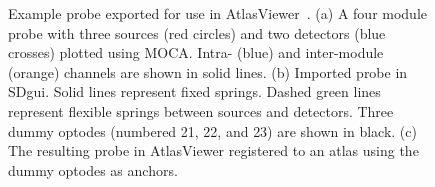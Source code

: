 \begin{figure}[]
\begin{center}
\end{center}
\caption{Example probe exported for use in AtlasViewer~\cite{Aasted2015}. (a) A four module probe with three sources (red circles) and two detectors (blue crosses) plotted using MOCA. Intra- (blue) and inter-module (orange) channels are shown in solid lines. (b) Imported probe in SDgui. Solid lines represent fixed springs. Dashed green lines represent flexible springs between sources and detectors. Three dummy optodes (numbered 21, 22, and 23) are shown in black. (c) The resulting probe in AtlasViewer registered to an atlas using the dummy optodes as anchors.}
\label{fig:SDoutput}

\end{figure} 



